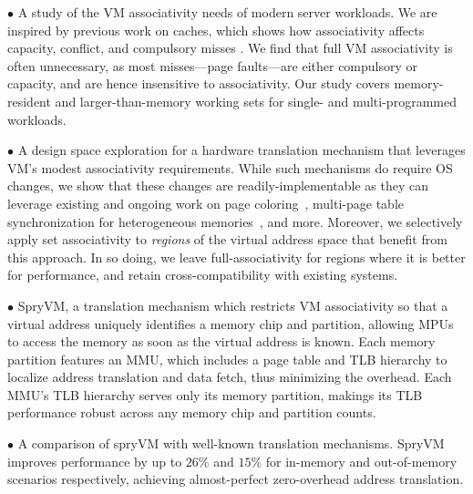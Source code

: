 \noindent $\bullet$ A study of the VM associativity needs of modern server workloads. We are inspired by previous work on caches, which shows how associativity affects capacity, conflict, and compulsory misses \cite{hill:case}. 
We find that full VM associativity is often unnecessary, as most misses---page faults---are either compulsory or capacity, and are hence insensitive to associativity. Our study covers memory-resident and larger-than-memory working sets for single- and multi-programmed workloads.

\noindent $\bullet$ A design space exploration for a hardware translation mechanism that leverages VM's modest associativity requirements. While such mechanisms do require OS changes, we show that these changes are readily-implementable as they can leverage existing and ongoing work on page coloring~\cite{mckusick:design}, multi-page table synchronization for heterogeneous memories~\cite{glisse:hmm}, and more. Moreover, we selectively apply set associativity to {\it regions} of the virtual address space that benefit from this approach. In so doing, we leave full-associativity for regions where it is better for performance, and retain cross-compatibility with existing systems.

\noindent $\bullet$ SpryVM, a translation mechanism which restricts VM associativity so that a virtual address uniquely identifies a memory chip and partition, allowing MPUs to access the memory as soon as the virtual address is known. Each memory partition features an MMU, which includes a page table and TLB hierarchy to localize address translation and data fetch, thus minimizing the overhead. Each MMU's TLB hierarchy serves only its memory partition, makings its TLB performance robust across any memory chip and partition counts.

\noindent $\bullet$ A comparison of spryVM with well-known translation mechanisms. SpryVM improves performance by up to $26\%$ and $15\%$ for in-memory and out-of-memory scenarios respectively, achieving almost-perfect zero-overhead address translation. 


